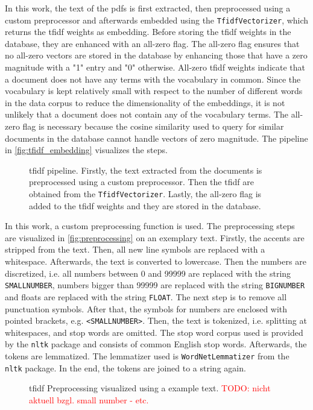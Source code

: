 In this work, the text of the \acp{pdf} is first extracted, then preprocessed using a custom preprocessor and afterwards embedded using the \texttt{TfidfVectorizer},
which returns the \ac{tfidf} weights as embedding.
Before storing the \ac{tfidf} weights in the database, they are enhanced with an all-zero flag.
The all-zero flag ensures that no all-zero vectors are stored in the database by enhancing those that have a zero magnitude with a "1" entry and "0" otherwise.
All-zero \ac{tfidf} weights indicate that a document does not have any terms with the vocabulary in common.
Since the vocabulary is kept relatively small with respect to the number of different words in the data corpus to reduce the dimensionality of the embeddings, 
it is not unlikely that a document does not contain any of the vocabulary terms.
The all-zero flag is necessary because the cosine similarity used to query for similar documents in the database cannot handle vectors of zero magnitude.
The pipeline in \autoref{fig:tfidf_embedding} visualizes the steps.

\begin{figure}[h] %
    \centering
    
    \caption{\ac{tfidf} pipeline.
    Firstly, the text extracted from the documents is preprocessed using a custom preprocessor.
    Then the \ac{tfidf} are obtained from the \texttt{TfidfVectorizer}.
    Lastly, the all-zero flag is added to the \ac{tfidf} weights and they are stored in the database.
    }
    \label{fig:tfidf_embedding}
\end{figure}

In this work, a custom preprocessing function is used.
The preprocessing steps are visualized in \autoref{fig:preprocessing} on an exemplary text.
Firstly, the accents are stripped from the text.
Then, all new line symbols are replaced with a whitespace.
Afterwards, the text is converted to lowercase.
Then the numbers are discretized, i.e. all numbers between 0 and 99999 are replaced with the string \texttt{SMALLNUMBER}, 
numbers bigger than 99999 are replaced with the string \texttt{BIGNUMBER} and floats are replaced with the string \texttt{FLOAT}.
The next step is to remove all punctuation symbols.
After that, the symbols for numbers are enclosed with pointed brackets, e.g. \texttt{<SMALLNUMBER>}.
Then, the text is tokenized, i.e. splitting at whitespaces, and stop words are omitted.
The stop word corpus used is provided by the \texttt{nltk} package and consists of common English stop words.
Afterwards, the tokens are lemmatized.
The lemmatizer used is \texttt{WordNetLemmatizer} from the \texttt{nltk} package.
In the end, the tokens are joined to a string again.


\begin{figure}[htp] %
    \centering
    
    \caption{\ac{tfidf} Preprocessing visualized using a example text. \textcolor{red}{TODO: nicht aktuell bzgl. small number - etc.}}
    \label{fig:preprocessing}
\end{figure}